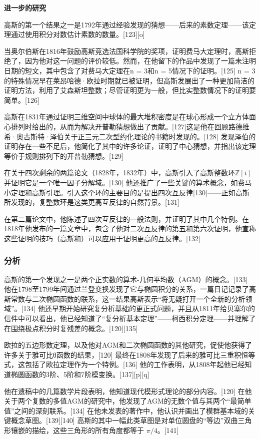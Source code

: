 \textbf{进一步的研究}  

高斯的第一个结果之一是1792年通过经验发现的猜想——后来的素数定理——该定理通过使用积分对数估计素数的数量。[123][o]  

当奥尔伯斯在1816年鼓励高斯竞选法国科学院的奖项，证明费马大定理时，高斯拒绝了，因为他对这一问题的评价较低。然而，在他留下的作品中发现了一篇未注明日期的短文，其中包含了对费马大定理在n = 3和n = 5情况下的证明。[125] n = 3的特殊情况早在莱昂哈德·欧拉时期就已被证明，但高斯发展出了一种更加简洁的证明方法，利用了艾森斯坦整数；尽管证明更为一般，但比实整数情况下的证明要简单。[126]  

高斯在1831年通过证明三维空间中球体的最大堆积密度是在球心形成一个立方体面心排列时给出的，从而为解决开普勒猜想做出了贡献。[127]这是他在回顾路德维希·奥古斯特·泽伯关于正三元二次型约化理论的书籍时发现的。[128] 发现泽伯的证明存在一些不足后，他简化了其中的许多论证，证明了中心猜想，并指出该定理等价于规则排列下的开普勒猜想。[129]  

在关于四次剩余的两篇论文（1828年，1832年）中，高斯引入了高斯整数环\(\mathbb{Z}[i]\)
并证明它是一个唯一因子分解域。[130] 他还推广了一些关键的算术概念，如费马小定理和高斯引理。引入这个环的主要目的是提出四次互反律[130]——正如高斯所发现的，复整数环是这类更高互反律的自然背景。[131]  

在第二篇论文中，他陈述了四次互反律的一般法则，并证明了其中几个特例。在1818年他发布的一篇文章中，包含了他对二次互反律的第五和第六次证明，他宣称这些证明的技巧（高斯和）可以应用于证明更高的互反律。[132]
\subsubsection{分析}  
高斯的第一个发现之一是两个正实数的算术-几何平均数（AGM）的概念。[133] 他在1798至1799年间通过兰登变换发现了它与椭圆积分的关系，一篇日记记录了高斯常数与二次椭圆函数的联系，这一结果高斯表示“将无疑打开一个全新的分析领域”。[134] 他还早期开始研究复分析基础的更正式问题，并且从1811年给贝塞尔的信件中可以看出，他已经知道了“复分析基本定理”——柯西积分定理——并理解了在围绕极点积分时复残差的概念。[120][135]

欧拉的五边形数定理，以及他对AGM和二次椭圆函数的其他研究，促使他获得了许多关于雅可比θ函数的结果，[120] 最终在1808年发现了后来的雅可比三重积恒等式，这包括了欧拉定理作为一个特例。[136] 他的工作表明，从1808年起他已经知道椭圆函数的3阶、5阶和7阶模变换。[137][p][q]  

他在遗稿中的几篇数学片段表明，他知道现代模形式理论的部分内容。[120] 在他关于两个复数的多值AGM的研究中，他发现了AGM的无数个值与其两个“最简单值”之间的深刻联系。[134] 在他未发表的著作中，他认识并画出了模群基本域的关键概念草图。[139][140] 高斯的其中一幅此类草图是对单位圆盘的“等边”双曲三角形镶嵌的描绘，这些三角形的所有角度都等于 
\(\pi /4\)。[141]

